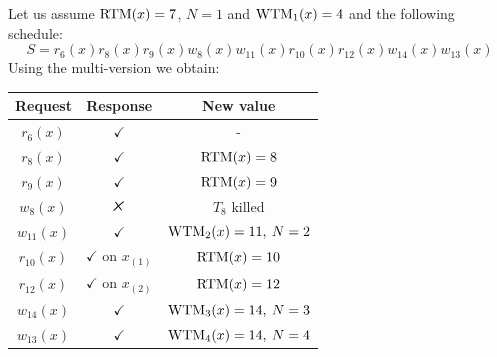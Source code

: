 \documentclass[12pt, a4paper]{report}
\newtheorem[style=M,bodystyle=\normalfont]{theorem}{Theorem}
\newtheorem[style=M,bodystyle=\normalfont]{corollary}{Corollary}
\newtheorem[style=M,bodystyle=\normalfont]{lemma}{Lemma}
\newtheorem[style=M,bodystyle=\normalfont]{definition}{Definition}
\newcommand{\tikzxmark}{%
\tikz[scale=0.23] {
    \draw[line width=0.7,line cap=round] (0,0) to [bend left=6] (1,1);
    \draw[line width=0.7,line cap=round] (0.2,0.95) to [bend right=3] (0.8,0.05);
}}
\begin{document}
    \begin{example}
        Let us assume $\textnormal{RTM}(x)=7$, $N=1$ and $\textnormal{WTM}_1(x)=4$ and the following schedule: 
        \[S=r_6(x) r_8(x) r_9(x) w_8(x) w_{11}(x) r_{10}(x) r_{12}(x) w_{14}(x) w_{13}(x)\]
        Using the multi-version we obtain: 
        \begin{table}[H]
            \centering
            \begin{tabular}{ccc}
            \textbf{Request} & \textbf{Response}         & \textbf{New value}  \\ \hline
            $r_6(x)$         & $\checkmark$              & -                   \\
            $r_8(x)$         & $\checkmark$              & $\textnormal{RTM}(x)=8$          \\
            $r_9(x)$         & $\checkmark$              & $\textnormal{RTM}(x)=9$          \\
            $w_8(x)$         & $\tikzxmark$              & $T_8$ killed        \\
            $w_{11}(x)$      & $\checkmark$              & $\textnormal{WTM}_2(x)=11,\:N=2$ \\
            $r_{10}(x)$      & $\checkmark$ on $x_{(1)}$ & $\textnormal{RTM}(x)=10$         \\
            $r_{12}(x)$      & $\checkmark$ on $x_{(2)}$ & $\textnormal{RTM}(x)=12$         \\
            $w_{14}(x)$      & $\checkmark$              & $\textnormal{WTM}_3(x)=14,\:N=3$ \\
            $w_{13}(x)$      & $\checkmark$              & $\textnormal{WTM}_4(x)=14,\:N=4$
            \end{tabular}
        \end{table}
    \end{example}
\end{document}
